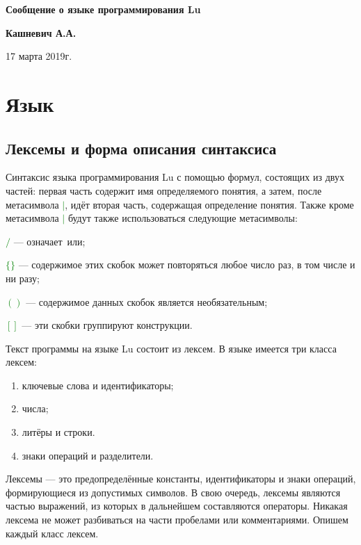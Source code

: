 \documentclass[10pt]{report}
\begin{document}
\begin{titlepage}
\begin{center}
\vspace*{8cm}

{\bf\Huge
Сообщение о языке программирования Lu

} \vspace{2.5cm}


\LARGE
\textbf{Кашневич А.А.}

 \vspace{2.5cm}

{17 марта 2019г.}

\end{center}
\end{titlepage}
\tableofcontents

\newpage

\chapter{Язык}
    \section{Лексемы и форма описания синтаксиса}

Синтаксис языка программирования Lu с помощью формул, состоящих из двух частей: первая часть содержит имя определяемого понятия, а затем, после метасимвола \textcolor{Green}{$|$}, идёт вторая часть, содержащая определение понятия. Также кроме метасимвола \textcolor{Green}{$|$} будут также использоваться следующие метасимволы:

\textcolor{Green}{$/$} --- означает\ \glqq или\grqq;

\textcolor{Green}{$\{\}$} --- содержимое этих скобок может повторяться любое число раз, в том числе и ни разу;

\textcolor{Green}{$( )$} --- содержимое данных скобок является необязательным;

\textcolor{Green}{$[ ]$} --- эти скобки группируют конструкции.

Текст программы на языке Lu состоит из лексем. В языке имеется три класса лексем:
\begin{enumerate}
    \item ключевые слова и идентификаторы;
    \item числа;
    \item литёры и строки.
    \item знаки операций и разделители.
\end{enumerate}
Лексемы --- это предопределённые константы, идентификаторы и знаки операций, формирующиеся из допустимых символов. В свою очередь, лексемы являются частью выражений, из которых в дальнейшем составляются операторы.
Никакая лексема не может разбиваться на части пробелами или комментариями. Опишем каждый класс лексем.
\end{document}
